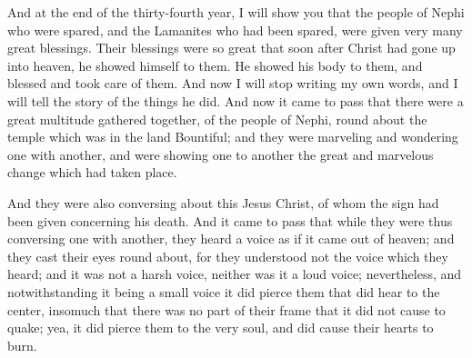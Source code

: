 And at the end of the thirty-fourth year, I will show you that the people of Nephi who were spared, and the Lamanites who had been spared, were given very many great blessings. Their blessings were so great that soon after Christ had gone up into heaven, he showed himself to them.
\bverse \iffalse Showing his body unto them, and ministering unto them; and an account of his ministry shall be given hereafter. Therefore for this time I make an end of my sayings. \fi
He showed his body to them, and blessed and took care of them. And now I will stop writing my own words, and I will tell the story of the things he did.
\bchapter
\bverse \iffalse And now it came to pass that there were a great multitude gathered together, of the people of Nephi, round about the temple which was in the land Bountiful; and they were marveling and wondering one with another, and were showing one to another the great and marvelous change which had taken place. \fi
And now it came to pass that there were a great multitude gathered together, of the people of Nephi, round about the temple which was in the land Bountiful; and they were marveling and wondering one with another, and were showing one to another the great and marvelous change which had taken place.
\iffalse And they were also conversing about this Jesus Christ, of whom the sign had been given concerning his death. \fi
And they were also conversing about this Jesus Christ, of whom the sign had been given concerning his death. 
\bverse \iffalse And it came to pass that while they were thus conversing one with another, they heard a voice as if it came out of heaven; and they cast their eyes round about, for they understood not the voice which they heard; and it was not a harsh voice, neither was it a loud voice; nevertheless, and notwithstanding it being a small voice it did pierce them that did hear to the center, insomuch that there was no part of their frame that it did not cause to quake; yea, it did pierce them to the very soul, and did cause their hearts to burn. \fi
And it came to pass that while they were thus conversing one with another, they heard a voice as if it came out of heaven; and they cast their eyes round about, for they understood not the voice which they heard; and it was not a harsh voice, neither was it a loud voice; nevertheless, and notwithstanding it being a small voice it did pierce them that did hear to the center, insomuch that there was no part of their frame that it did not cause to quake; yea, it did pierce them to the very soul, and did cause their hearts to burn.
